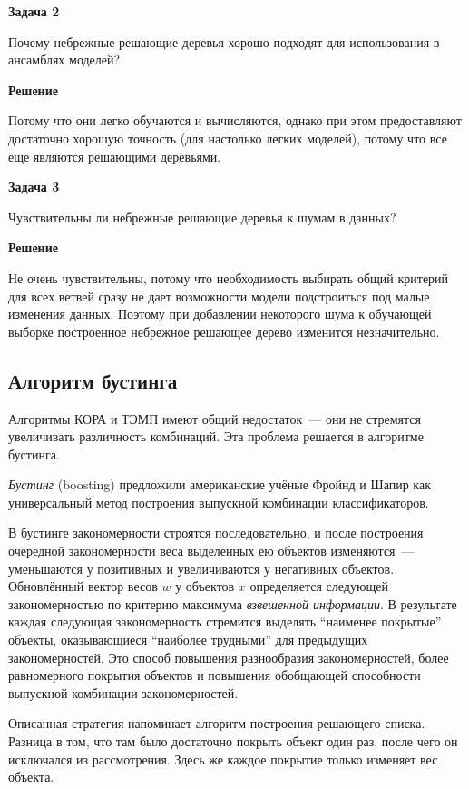 \textbf{Задача 2}

Почему небрежные решающие деревья хорошо подходят для использования в ансамблях моделей?

\textbf{Решение}

Потому что они легко обучаются и вычисляются,
однако при этом предоставляют достаточно хорошую точность (для настолько легких моделей), потому что все еще являются
решающими деревьями.

\textbf{Задача 3}

Чувствительны ли небрежные решающие деревья к шумам в данных?

\textbf{Решение}

Не очень чувствительны, потому что необходимость выбирать общий критерий для всех ветвей сразу не дает возможности
модели подстроиться под малые изменения данных. Поэтому при добавлении некоторого шума к обучающей выборке построенное
небрежное решающее дерево изменится незначительно.

\subsection*{Алгоритм бустинга}

Алгоритмы КОРА и ТЭМП имеют общий недостаток~--- они не стремятся увеличивать различность комбинаций. Эта проблема решается в алгоритме бустинга.

\textit{Бустинг} (boosting) предложили американские учёные Фройнд и Шапир как универсальный метод построения выпускной комбинации классификаторов. 

В бустинге закономерности строятся последовательно, и после построения очередной закономерности веса выделенных ею объектов изменяются~--- уменьшаются у позитивных и увеличиваются у негативных объектов. Обновлённый вектор весов $w$ у объектов $x$ определяется следующей закономерностью по критерию максимума \textit{взвешенной информации}. В результате каждая следующая закономерность стремится выделять ``наименее покрытые'' объекты, оказывающиеся ``наиболее трудными'' для предыдущих закономерностей. Это способ повышения разнообразия закономерностей, более равномерного покрытия объектов и повышения обобщающей способности выпускной комбинации закономерностей.

Описанная стратегия напоминает алгоритм построения решающего списка. Разница в том, что там было достаточно покрыть объект один раз, после чего он исключался из рассмотрения. Здесь же каждое покрытие только изменяет вес объекта.

